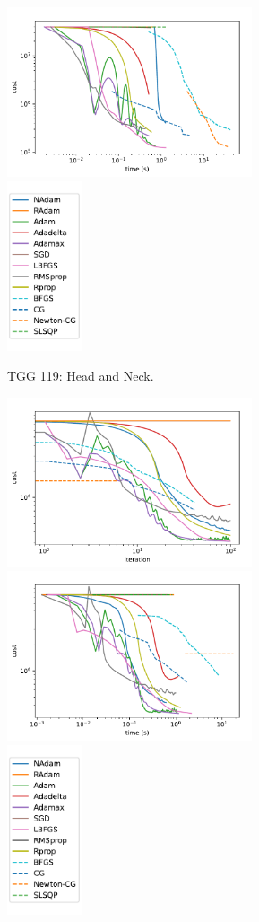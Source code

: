 \begin{figure}
\begin{subfigure}{\textwidth}
		\includegraphics[height=5cm]{optimizers_comparison/TGG119HN-time.pdf}
		\includegraphics[height=5cm]{optimizers_comparison/legend.pdf}
		\caption{TGG 119: Head and Neck.}
		\label{fig:TGG119_HN}
	\end{subfigure}
	\begin{subfigure}{\textwidth}
		\centering
		\includegraphics[height=5cm]{optimizers_comparison/TGG119Prostate-iter.pdf}
		\includegraphics[height=5cm]{optimizers_comparison/TGG119Prostate-time.pdf}
		\includegraphics[height=5cm]{optimizers_comparison/legend.pdf}

\end{subfigure}
\end{figure}
